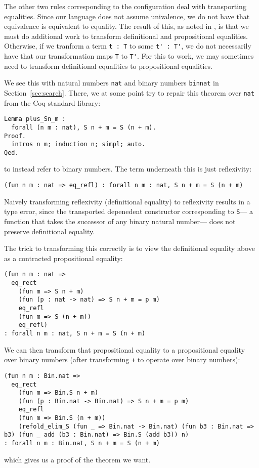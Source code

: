 The other two rules corresponding to the configuration deal with transporting equalities.
Since our language does not assume univalence, we do not have that equivalence is equivalent to equality.
The result of this, as noted in \citet{tabareau2019marriage},
is that we must do additional work to transform definitional and propositional equalities.
Otherwise, if we tranform a term \lstinline{t : T} to some \lstinline{t' : T'}, we do not necessarily
have that our transformation maps \lstinline{T} to \lstinline{T'}.
For this to work, we may sometimes need to transform definitional equalities to propositional equalities.

We see this with natural numbers \lstinline{nat} and binary numbers \lstinline{binnat}
in Section~\ref{sec:search}.
There, we at some point try to repair this theorem over \lstinline{nat} from the Coq standard library:

\begin{lstlisting}
Lemma plus_Sn_m :
  forall (n m : nat), S n + m = S (n + m).
Proof.
  intros n m; induction n; simpl; auto.
Qed.
\end{lstlisting}
to instead refer to binary numbers.
The term underneath this is just reflexivity:

\begin{lstlisting}
(fun n m : nat => eq_refl) : forall n m : nat, S n + m = S (n + m)
\end{lstlisting}
Naively transforming reflexivity (definitional equality) to reflexivity results in a type error,
since the transported depenedent constructor corresponding to \lstinline{S}---
a function that takes the successor of any binary natural number---
does not preserve definitional equality.

The trick to transforming this correctly is to view the definitional equality above as a contracted propositional equality:

\begin{lstlisting}
(fun n m : nat =>
  eq_rect
    (fun m => S n + m)
    (fun (p : nat -> nat) => S n + m = p m)
    eq_refl
    (fun m => S (n + m))
    eq_refl)
: forall n m : nat, S n + m = S (n + m)
\end{lstlisting}
We can then transform that propositional equality to a propositional equality over binary numbers (after transforming \lstinline{+} to operate
over binary numbers):

\begin{lstlisting}
(fun n m : Bin.nat =>
  eq_rect
    (fun m => Bin.S n + m)
    (fun (p : Bin.nat -> Bin.nat) => S n + m = p m)
    eq_refl
    (fun m => Bin.S (n + m))
    (refold_elim_S (fun _ => Bin.nat -> Bin.nat) (fun b3 : Bin.nat => b3) (fun _ add (b3 : Bin.nat) => Bin.S (add b3)) n)
: forall n m : Bin.nat, S n + m = S (n + m)
\end{lstlisting}
which gives us a proof of the theorem we want.


